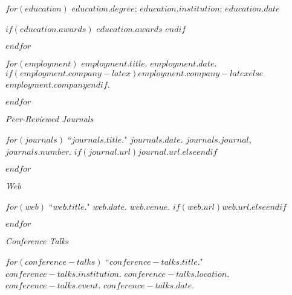 \documentclass[11pt,article,oneside]{memoir}
\begin{document}
\medskip

\reversemarginpar

\bigskip


$for(education)$
\ind $education.degree$; $education.institution$; $education.date$

$if(education.awards)$
\ind \hspace{0.35in} \footnotesize $education.awards$ \normalsize \vspace{0.05in}
$endif$

\smallskip
$endfor$

\bigskip


$for(employment)$
\ind $employment.title$. $employment.date$. $if(employment.company-latex)$$employment.company-latex$$else$$employment.company$$endif$.

\smallskip
$endfor$

\bigskip
\pagebreak[1]


\ind \emph{Peer-Reviewed Journals}

\smallskip

$for(journals)$
\ind ``$journals.title$." $journals.date$. \emph{$journals.journal$}, $journals.number$. $if(journal.url)$\href{$journal.url$}{$journal.url$}.$else${}$endif$

\smallskip
$endfor$
\medskip

\ind \emph{Web}

\smallskip

$for(web)$
\ind ``$web.title$." $web.date$. \emph{$web.venue$}. $if(web.url)$\href{$web.url$}{$web.url$}.$else${}$endif$

\smallskip
$endfor$

\bigskip
\pagebreak[1]


\ind \emph{Conference Talks}

\smallskip

$for(conference-talks)$
\ind ``$conference-talks.title$." $conference-talks.institution$. $conference-talks.location$. \emph{$conference-talks.event$}. $conference-talks.date$. \normalsize
\end{document}
